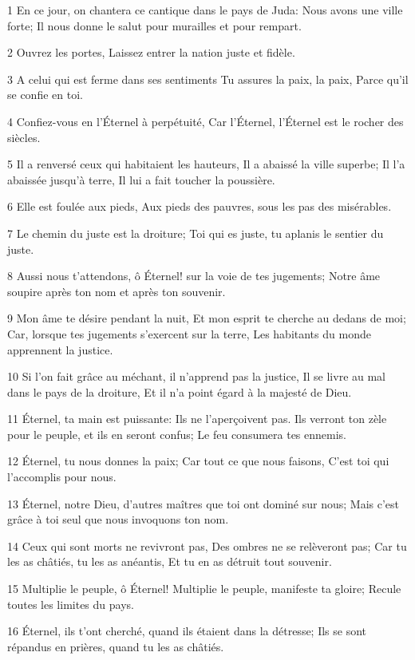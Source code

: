 \par 1 En ce jour, on chantera ce cantique dans le pays de Juda: Nous avons une ville forte; Il nous donne le salut pour murailles et pour rempart.
\par 2 Ouvrez les portes, Laissez entrer la nation juste et fidèle.
\par 3 A celui qui est ferme dans ses sentiments Tu assures la paix, la paix, Parce qu'il se confie en toi.
\par 4 Confiez-vous en l'Éternel à perpétuité, Car l'Éternel, l'Éternel est le rocher des siècles.
\par 5 Il a renversé ceux qui habitaient les hauteurs, Il a abaissé la ville superbe; Il l'a abaissée jusqu'à terre, Il lui a fait toucher la poussière.
\par 6 Elle est foulée aux pieds, Aux pieds des pauvres, sous les pas des misérables.
\par 7 Le chemin du juste est la droiture; Toi qui es juste, tu aplanis le sentier du juste.
\par 8 Aussi nous t'attendons, ô Éternel! sur la voie de tes jugements; Notre âme soupire après ton nom et après ton souvenir.
\par 9 Mon âme te désire pendant la nuit, Et mon esprit te cherche au dedans de moi; Car, lorsque tes jugements s'exercent sur la terre, Les habitants du monde apprennent la justice.
\par 10 Si l'on fait grâce au méchant, il n'apprend pas la justice, Il se livre au mal dans le pays de la droiture, Et il n'a point égard à la majesté de Dieu.
\par 11 Éternel, ta main est puissante: Ils ne l'aperçoivent pas. Ils verront ton zèle pour le peuple, et ils en seront confus; Le feu consumera tes ennemis.
\par 12 Éternel, tu nous donnes la paix; Car tout ce que nous faisons, C'est toi qui l'accomplis pour nous.
\par 13 Éternel, notre Dieu, d'autres maîtres que toi ont dominé sur nous; Mais c'est grâce à toi seul que nous invoquons ton nom.
\par 14 Ceux qui sont morts ne revivront pas, Des ombres ne se relèveront pas; Car tu les as châtiés, tu les as anéantis, Et tu en as détruit tout souvenir.
\par 15 Multiplie le peuple, ô Éternel! Multiplie le peuple, manifeste ta gloire; Recule toutes les limites du pays.
\par 16 Éternel, ils t'ont cherché, quand ils étaient dans la détresse; Ils se sont répandus en prières, quand tu les as châtiés.
